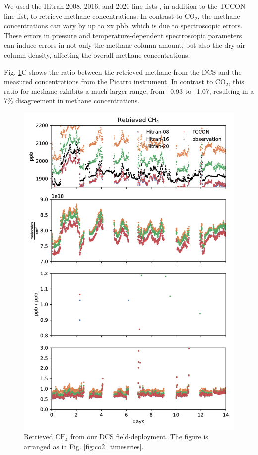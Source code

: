 \documentclass[amt, manuscript]{copernicus}
\begin{document}
We used the Hitran 2008, 2016, and 2020 line-lists , in addition to the TCCON line-list, to retrieve methane concentrations. In contrast to CO$_2$, the methane concentrations can vary by up to xx pbb, which is due to spectroscopic errors. These errors in pressure and temperature-dependent spectroscopic parameters can induce errors in not only the methane column amount, but also the dry air column density, affecting the overall methane concentrations.

Fig. \ref{fig:ch4_timeseries}C shows the ratio between the retrieved methane from the DCS and the measured concentrations from the Picarro instrument. In contrast to CO$_2$, this ratio for methane exhibits a much larger range, from ~0.93 to ~1.07, resulting in a 7\% disagreement in methane concentrations.

\begin{figure}
  \centering
  \includegraphics{ch4_timeseries.pdf}
  \caption{Retrieved CH$_4$ from our DCS field-deployment. The figure is arranged as in Fig. \ref{fig:co2_timeseries}.}
  \label{fig:ch4_timeseries}
\end{figure}
\end{document}
